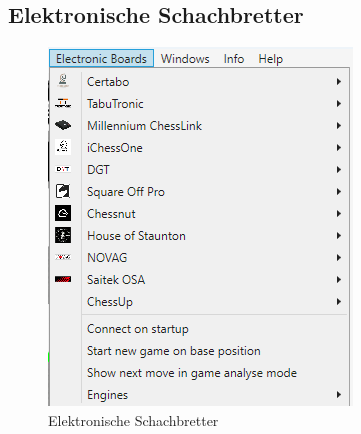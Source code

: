 \documentclass[11pt,a4paper]{article}
\begin{document}
	\subsection{Elektronische Schachbretter}
	\begin{figure}[H]
		\centering
		\includegraphics[scale=1.0]{ElectronicBoards.png}
		\caption{Elektronische Schachbretter}
		\label{fig:ElectronicBoards}
	\end{figure}
\end{document}
